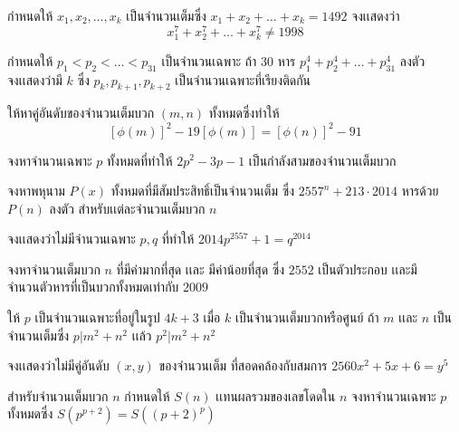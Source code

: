 \documentclass[a4paper,12pt]{scrartcl}
\begin{document}
	\begin{example}
		กำหนดให้ $x_1,x_2,\dots,x_k$ เป็นจำนวนเต็มซึ่ง $x_1+x_2+\dots+x_k = 1492$ จงเเสดงว่า \[ x_1^7+x_2^7+\dots+x_k^7 \neq 1998 \]
	\end{example}
	\begin{example}
			กำหนดให้ $p_1<p_2<\dots<p_{31}$ เป็นจำนวนเฉพาะ ถ้า $30$ หาร  $p_1^4+p_2^4+\dots+p_{31}^4$ ลงตัว \\ จงเเสดงว่ามี $k$ ซึ่ง $p_k,p_{k+1},p_{k+2}$ เป็นจำนวนเฉพาะที่เรียงติดกัน
	\end{example}
	\begin{example}
		ให้หาคู่อันดับของจำนวนเต็มบวก $(m,n)$ ทั้งหมดซึ่งทำให้ \[  [\phi(m)]^2-19[\phi(m)] = [\phi(n)]^2-91 \]
	\end{example}
	\begin{example}
		จงหาจำนวนเฉพาะ $p$ ทั้งหมดที่ทำให้ $2p^2-3p-1$ เป็นกำลังสามของจำนวนเต็มบวก
	\end{example}
	\begin{example}
		จงหาพหุนาม $P(x)$ ทั้งหมดที่มีสัมประสิทธิ์เป็นจำนวนเต็ม ซึ่ง $2557^n+213\cdot2014$ หารด้วย $P(n)$ ลงตัว สำหรับเเต่ละจำนวนเต็มบวก $n$
	\end{example}
	\begin{example}
		จงเเสดงว่าไม่มีจำนวนเฉพาะ $p,q$ ที่ทำให้ $2014p^{2557} + 1 = q^{2014}$
	\end{example}
	\begin{example}
		จงหาจำนวนเต็มบวก $n$ ที่มีค่ามากที่สุด เเละ มีค่าน้อยที่สุด ซึ่ง $2552$ เป็นตัวประกอบ เเละมี\\ จำนวนตัวหารที่เป็นบวกทั้งหมดเท่ากับ $2009$
	\end{example}
	\begin{example}
		ให้ $p$ เป็นจำนวนเฉพาะที่อยู่ในรูป $4k+3$ เมื่อ $k$ เป็นจำนวนเต็มบวกหรือศูนย์ ถ้า $m$ เเละ $n$ เป็นจำนวนเต็มซึ่ง $p|m^2+n^2$ เเล้ว $p^2|m^2+n^2$
	\end{example}
	\begin{example}
		จงเเสดงว่าไม่มีคู่อันดับ $(x,y)$ ของจำนวนเต็ม ที่สอดคล้องกับสมการ $2560x^2+5x+6 = y^5$
	\end{example}
	\begin{example}
		สำหรับจำนวนเต็มบวก $n$ กำหนดให้ $S(n)$ เเทนผลรวมของเลขโดดใน $n$ จงหาจำนวนเฉพาะ $p$ \\ทั้งหมดซึ่ง $S(p^{p+2})=S((p+2)^p)$
	\end{example}
\end{document}
